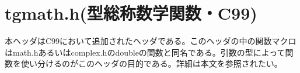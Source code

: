 \section{tgmath.h(型総称数学関数・C99)}
本ヘッダはC99において追加されたヘッダである。このヘッダの中の関数マクロはmath.hあるいはcomplex.hのdoubleの関数と同名である。引数の型によって関数を使い分けるのがこのヘッダの目的である。詳細は本文を参照されたい。

\newpage
